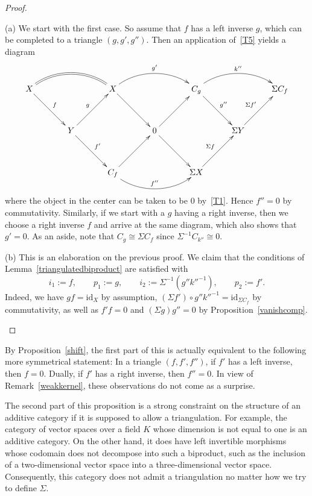 \documentclass{amsproc}
\theoremstyle{definition}
\begin{document}
\begin{proof}
\begin{compactenum}
\item[(a)]
We start with the first case. So assume that $f$ has a left inverse $g$, which can be completed to a triangle $(g,g',g'')$. Then an application of~\ref{T5} yields a diagram
\begin{displaymath}
\xymatrix@!{X\ar@(ru,lu)@{=}[rr]\ar[rd]^f & & X\ar@(ru,lu)[rr]^{g'}\ar[rd] & & C_g\ar@(ru,lu)[rr]^{k''}\ar[rd]^{g''} & & {\Sigma C_f}\\
& Y	\ar[ur]^g\ar[rd]^{f'} & & 0\ar[ru]\ar[rd] & & \Sigma Y\ar[ru]^{\Sigma f'} &\\
& & C_f\ar@(rd,ld)[rr]^{f''}\ar[ru] & &\Sigma X\ar[ru]^{\Sigma f} & &}
\end{displaymath}
where the object in the center can be taken to be $0$ by~\ref{T1}. Hence $f''=0$ by commutativity. Similarly, if we start with a $g$ having a right inverse, then we choose a right inverse $f$ and arrive at the same diagram, which also shows that $g'=0$. As an aside, note that $C_g\cong \Sigma C_f$ since $\Sigma^{-1} C_{k''}\cong 0$.
\item[(b)]
This is an elaboration on the previous proof. We claim that the conditions of Lemma~\ref{triangulatedbiproduct} are satisfied with
\[
i_1:=f,\qquad p_1:=g,\qquad i_2:=\Sigma^{-1}(g''k''^{-1}),\qquad p_2:=f'.
\]
Indeed, we have $gf={\mathrm{id}}_X$ by assumption, $(\Sigma f')\circ g'' k''^{-1} = {\mathrm{id}}_{\Sigma C_f}$ by commutativity, as well as $f'f=0$ and $(\Sigma g)g''=0$ by Proposition~\ref{vanishcomp}.\qedhere
\end{compactenum}
\end{proof}

By Proposition~\ref{shift}, the first part of this is actually equivalent to the following more symmetrical statement: In a triangle $(f,f',f'')$, if $f'$ has a left inverse, then $f=0$. Dually, if $f'$ has a right inverse, then $f''=0$. In view of Remark~\ref{weakkernel}, these observations do not come as a surprise.

The second part of this proposition is a strong constraint on the structure of an additive category if it is supposed to allow a triangulation. For example, the category of vector spaces over a field $K$ whose dimension is not equal to one is an additive category. On the other hand, it does have left invertible morphisms whose codomain does not decompose into such a biproduct, such as the inclusion of a two-dimensional vector space into a three-dimensional vector space. Consequently, this category does not admit a triangulation no matter how we try to define $\Sigma$.
\end{document}
